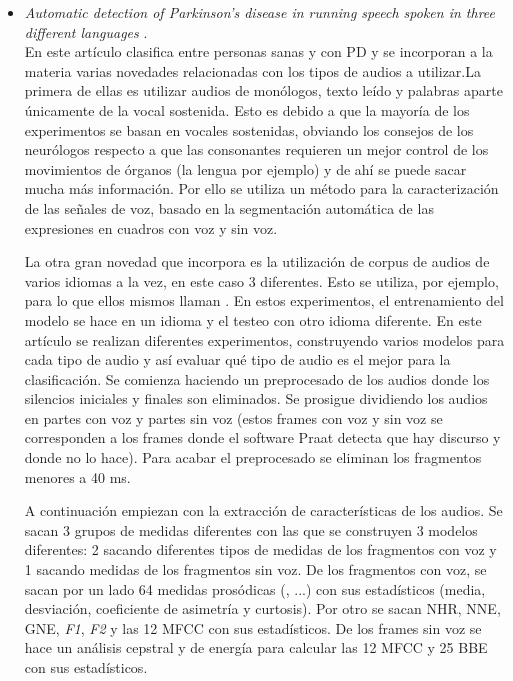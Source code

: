 \begin{itemize}
	\item \textit{Automatic detection of Parkinson’s disease in running speech spoken in three different languages} \cite{Orz2016}.\\
	En este artículo clasifica entre personas sanas y con PD y se incorporan a la materia varias novedades relacionadas con los tipos de audios a utilizar.La primera de ellas es utilizar audios de monólogos, texto leído y palabras aparte únicamente de la vocal sostenida. Esto es debido a que la mayoría de los experimentos se basan en vocales sostenidas, obviando los consejos de los neurólogos respecto a que las consonantes requieren un mejor control de los movimientos de órganos (la lengua por ejemplo) y de ahí se puede sacar mucha más información. Por ello se utiliza un método para la caracterización de las señales de voz, basado en la segmentación automática de las expresiones en cuadros con voz y sin voz.
	
	La otra gran novedad que incorpora es la utilización de corpus de audios de varios idiomas a la vez, en este caso 3 diferentes. Esto se utiliza, por ejemplo, para lo que ellos mismos llaman . En estos experimentos, el entrenamiento del modelo se hace en un idioma y el testeo con otro idioma diferente. En este artículo se realizan diferentes experimentos, construyendo varios modelos para cada tipo de audio y así evaluar qué tipo de audio es el mejor para la clasificación. Se comienza haciendo un preprocesado de los audios donde los silencios iniciales y finales son eliminados. Se prosigue dividiendo los audios en partes con voz y partes sin voz (estos frames con voz y sin voz se corresponden a los frames donde el software Praat \cite{praat} detecta que hay discurso y donde no lo hace). Para acabar el preprocesado se eliminan los fragmentos menores a 40 ms.
	
	A continuación empiezan con la extracción de características de los audios. Se sacan 3 grupos de medidas diferentes con las que se construyen 3 modelos diferentes: 2 sacando diferentes tipos de medidas de los fragmentos con voz y 1 sacando medidas de los fragmentos sin voz. De los fragmentos con voz, se sacan por un lado 64 medidas prosódicas (, ...) con sus estadísticos (media, desviación, coeficiente de asimetría y curtosis). Por otro se sacan NHR, NNE, GNE, \textit{F1}, \textit{F2} y las 12 MFCC con sus estadísticos. De los frames sin voz se hace un análisis cepstral y de energía para calcular las 12 MFCC y 25 BBE con sus estadísticos. 
	

\end{itemize}
